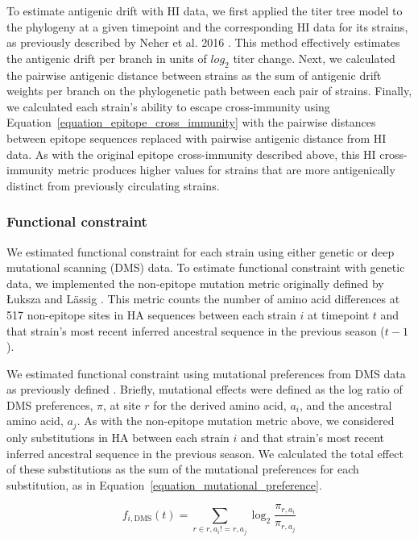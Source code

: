 To estimate antigenic drift with HI data, we first applied the titer tree model to the phylogeny at a given timepoint and the corresponding HI data for its strains, as previously described by Neher et al. 2016 \cite{Neher:2016hy}.
This method effectively estimates the antigenic drift per branch in units of $log_{2}$ titer change.
Next, we calculated the pairwise antigenic distance between strains as the sum of antigenic drift weights per branch on the phylogenetic path between each pair of strains.
Finally, we calculated each strain's ability to escape cross-immunity using Equation~\ref{equation_epitope_cross_immunity} with the pairwise distances between epitope sequences replaced with pairwise antigenic distance from HI data.
As with the original epitope cross-immunity described above, this HI cross-immunity metric produces higher values for strains that are more antigenically distinct from previously circulating strains.

\subsubsection*{Functional constraint}

We estimated functional constraint for each strain using either genetic or deep mutational scanning (DMS) data.
To estimate functional constraint with genetic data, we implemented the non-epitope mutation metric originally defined by {\L}uksza and L\"assig \cite{Luksza:2014hj}.
This metric counts the number of amino acid differences at 517 non-epitope sites in HA sequences between each strain $i$ at timepoint $t$ and that strain's most recent inferred ancestral sequence in the previous season ($t - 1$).

We estimated functional constraint using mutational preferences from DMS data as previously defined \cite{Lee2018}.
Briefly, mutational effects were defined as the log ratio of DMS preferences, $\pi$, at site $r$ for the derived amino acid, $a_{i}$, and the ancestral amino acid, $a_{j}$.
As with the non-epitope mutation metric above, we considered only substitutions in HA between each strain $i$ and that strain's most recent inferred ancestral sequence in the previous season.
We calculated the total effect of these substitutions as the sum of the mutational preferences for each substitution, as in Equation~\ref{equation_mutational_preference}.

\begin{equation}
    f_{i,\mathrm{DMS}}(t) = \sum_{r \in r,a_{i} != r,a_{j}}\log_{2}\frac{\pi_{r,a_{i}}}{\pi_{r,a_{j}}}
    \label{equation_mutational_preference}
\end{equation}

